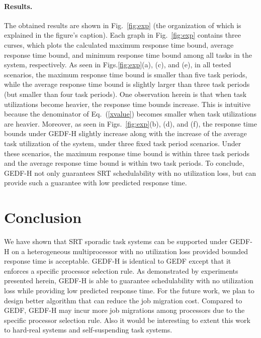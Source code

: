 \documentclass[Times, 10pt,twocolumn]{article}
\theoremstyle{definition}
\begin{document}
\paragraph{Results.} The obtained results are shown in Fig.~\ref{fig:exp} (the organization of which is explained in the figure's caption). Each graph in Fig.~\ref{fig:exp} contains three curses, which plots the calculated maximum response time bound, average response time bound, and minimum response time bound among all tasks in the system, respectively. As seen in Figs.\ref{fig:exp}(a), (c), and (e), in all tested scenarios, the maximum response time bound is smaller than five task periods, while the average response time bound is slightly larger than three task periods (but smaller than four task periods). One observation herein is that when task utilizations become heavier, the response time bounds increase. This is intuitive because the denominator of Eq.~(\ref{xvalue}) becomes smaller when task utilizations are heavier. Moreover, as seen in Figs.~\ref{fig:exp}(b), (d), and (f), the response time bounds under GEDF-H  slightly increase along with the increase of the average task utilization of the system, under three fixed task period scenarios. Under these scenarios, the maximum response time bound is within three task periods and the average response time bound is within two task periods. To conclude, GEDF-H not only guarantees SRT schedulability with no utilization loss, but can provide such a guarantee with low predicted response time.




\section{Conclusion}
\label{sec:Conclusion}
We have shown that SRT sporadic task systems can be supported under GEDF-H on a heterogeneous multiprocessor with no utilization loss provided bounded response time is acceptable. GEDF-H is identical to GEDF except that it enforces a specific processor selection rule. As demonstrated by experiments presented herein, GEDF-H is able to guarantee schedulability with no utilization loss while providing low predicted response time. For the future work, we plan to design better algorithm that can reduce the job migration cost. Compared to GEDF, GEDF-H may incur more job migrations among processors due to the specific processor selection rule. Also it would be interesting to extent this work to hard-real systems and self-suspending task systems.
\end{document}
